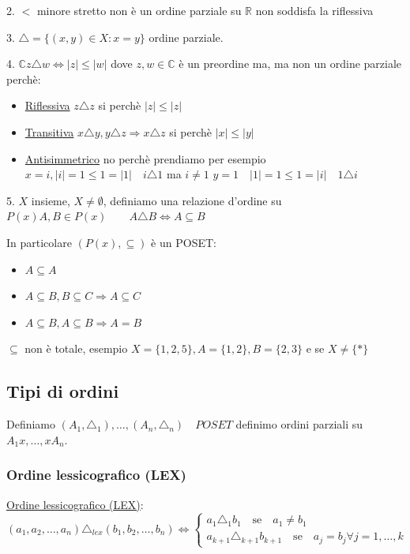 \documentclass{article}
\begin{document}
2. $ < $ minore stretto non è un ordine parziale su $ \mathbb{R} $ non soddisfa la riflessiva \newline

3. $ \triangle = \{(x,y) \in X : x = y\}$ ordine parziale. \newline 

4. $ \mathbb{C} z \triangle w \Leftrightarrow |z| \le |w| $ dove $ z,w \in \mathbb{C} $  è un preordine ma, ma non un ordine parziale perchè:

\begin{itemize}
        \item \underline{Riflessiva} $ z \triangle z$ si perchè $ |z| \le |z| $
        \item \underline{Transitiva} $ x \triangle y, y \triangle z \Rightarrow x \triangle z$  si perchè $ |x| \le |y| $
        \item \underline{Antisimmetrico} no perchè prendiamo per esempio \newline $ x = i, |i| = 1 \le 1 = |1| \quad i \triangle 1 $ ma $ i \not = 1 $  \newline $ y = 1 \quad |1| = 1 \le 1 = |i| \quad 1 \triangle i $    
\end{itemize}

5. $ X $ insieme, $ X \not = \emptyset $, definiamo una relazione d'ordine su $ P(x)  A,B \in P(x) \quad \quad A \triangle B \Leftrightarrow A \subseteq B $ \par
In particolare $ (P(x), \subseteq )$ è un POSET:\newline
\begin{itemize}
        \item $ A \subseteq A $
        \item $ A \subseteq B, B \subseteq C \Rightarrow A \subseteq C $
        \item $ A \subseteq B, A \subseteq B \Rightarrow A = B $
\end{itemize}
$ \subseteq $ non è totale, esempio $ X = \{1,2,5\}, A = \{1,2\}, B = \{2,3\} $ e se $ X \not = \{*\} $


\subsection{Tipi di ordini}
Definiamo $(A_1, \triangle_1), \ldots, (A_n, \triangle_n) \quad POSET$ definimo ordini parziali su $A_1x, \ldots, xA_n$. \newline


\subsubsection{Ordine lessicografico (LEX)}
\underline{Ordine lessicografico (LEX)}:
\[ 
(a_1,a_2,\ldots, a_n) \triangle_{lex} (b_1,b_2,\ldots, b_n) \Leftrightarrow   
\begin{cases}
        a_1 \triangle_1 b_1 \quad \mbox{se} \quad  a_1 \not = b_1 \\
        a_{k+1} \triangle_{k+1} b_{k+1} \quad \mbox{se} \quad  a_j = b_j \forall j = 1,\ldots, k
\end{cases}
\]
\end{document}
